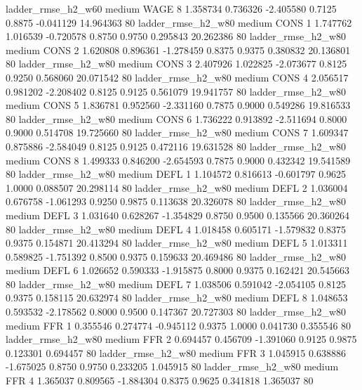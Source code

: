     ladder_rmse_h2_w60     medium     WAGE                 8  1.358734 0.736326 -2.405580 0.7125 0.8875 -0.041129   14.964363 80
    ladder_rmse_h2_w80     medium     CONS                 1  1.747762 1.016539 -0.720578 0.8750 0.9750  0.295843   20.262386 80
    ladder_rmse_h2_w80     medium     CONS                 2  1.620808 0.896361 -1.278459 0.8375 0.9375  0.380832   20.136801 80
    ladder_rmse_h2_w80     medium     CONS                 3  2.407926 1.022825 -2.073677 0.8125 0.9250  0.568060   20.071542 80
    ladder_rmse_h2_w80     medium     CONS                 4  2.056517 0.981202 -2.208402 0.8125 0.9125  0.561079   19.941757 80
    ladder_rmse_h2_w80     medium     CONS                 5  1.836781 0.952560 -2.331160 0.7875 0.9000  0.549286   19.816533 80
    ladder_rmse_h2_w80     medium     CONS                 6  1.736222 0.913892 -2.511694 0.8000 0.9000  0.514708   19.725660 80
    ladder_rmse_h2_w80     medium     CONS                 7  1.609347 0.875886 -2.584049 0.8125 0.9125  0.472116   19.631528 80
    ladder_rmse_h2_w80     medium     CONS                 8  1.499333 0.846200 -2.654593 0.7875 0.9000  0.432342   19.541589 80
    ladder_rmse_h2_w80     medium     DEFL                 1  1.104572 0.816613 -0.601797 0.9625 1.0000  0.088507   20.298114 80
    ladder_rmse_h2_w80     medium     DEFL                 2  1.036004 0.676758 -1.061293 0.9250 0.9875  0.113638   20.326078 80
    ladder_rmse_h2_w80     medium     DEFL                 3  1.031640 0.628267 -1.354829 0.8750 0.9500  0.135566   20.360264 80
    ladder_rmse_h2_w80     medium     DEFL                 4  1.018458 0.605171 -1.579832 0.8375 0.9375  0.154871   20.413294 80
    ladder_rmse_h2_w80     medium     DEFL                 5  1.013311 0.589825 -1.751392 0.8500 0.9375  0.159633   20.469486 80
    ladder_rmse_h2_w80     medium     DEFL                 6  1.026652 0.590333 -1.915875 0.8000 0.9375  0.162421   20.545663 80
    ladder_rmse_h2_w80     medium     DEFL                 7  1.038506 0.591042 -2.054105 0.8125 0.9375  0.158115   20.632974 80
    ladder_rmse_h2_w80     medium     DEFL                 8  1.048653 0.593532 -2.178562 0.8000 0.9500  0.147367   20.727303 80
    ladder_rmse_h2_w80     medium      FFR                 1  0.355546 0.274774 -0.945112 0.9375 1.0000  0.041730    0.355546 80
    ladder_rmse_h2_w80     medium      FFR                 2  0.694457 0.456709 -1.391060 0.9125 0.9875  0.123301    0.694457 80
    ladder_rmse_h2_w80     medium      FFR                 3  1.045915 0.638886 -1.675025 0.8750 0.9750  0.233205    1.045915 80
    ladder_rmse_h2_w80     medium      FFR                 4  1.365037 0.809565 -1.884304 0.8375 0.9625  0.341818    1.365037 80
